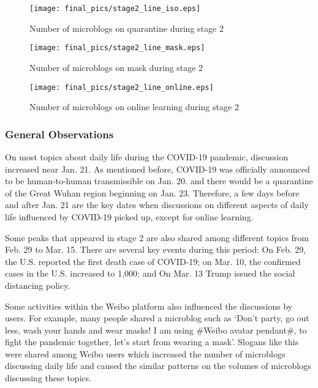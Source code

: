 \documentclass[sigconf, nonacm=true]{acmart}
\begin{document}
\begin{figure*}[t]
\begin{minipage}[t]{0.3\linewidth}
\centering
  \texttt{[image: final\_pics/stage2\_line\_iso.eps]}
  \vspace{-0.1cm}
  \caption{Number of microblogs on quarantine during stage 2}
  \vspace{-0.2cm}
  \label{figure:stage2_line_iso}
\end{minipage}
\begin{minipage}[t]{0.3\linewidth}
\centering
   \texttt{[image: final\_pics/stage2\_line\_mask.eps]}
   \vspace{-0.1cm}
  \caption{Number of microblogs on mask during stage 2}
  \vspace{-0.2cm}
  \label{figure:stage2_line_mask}
\end{minipage}
\begin{minipage}[t]{0.3\linewidth}
\centering
 \texttt{[image: final\_pics/stage2\_line\_online.eps]}
 \vspace{-0.1cm}
  \caption{Number of microblogs on online learning during stage 2}
  \vspace{-0.2cm}
  \label{figure:stage2_line_online}
\end{minipage}%
\end{figure*} 

\vspace{-0.2cm}
\subsubsection{General Observations}
On most topics about daily life during the COVID-19 pandemic, discussion increased near Jan. 21. 
As mentioned before, COVID-19 was officially announced to be human-to-human transmissible on Jan. 20. and there would be a quarantine of the Great Wuhan region beginning on Jan. 23.
Therefore, a few days before and after Jan. 21 are the key dates when discussions on different aspects of daily life influenced by COVID-19 picked up, except for online learning.

Some peaks that appeared in stage 2 are also shared among different topics from Feb. 29 to Mar. 15.
There are several key events during this period: 
On Feb. 29, the U.S. reported the first death case of COVID-19; on Mar. 10, the confirmed cases in the U.S. increased to 1,000; and On Mar. 13 Trump issued the social distancing policy.

Some activities within the Weibo platform also influenced the discussions by users.
For example, many people shared a microblog such as `Don't party, go out less, wash your hands and wear masks! I am using \#Weibo avatar pendant\#, to fight the pandemic together, let's start from wearing a mask'.
Slogans like this were shared among Weibo users which increased the number of microblogs discussing daily life and caused the similar patterns on the volumes of microblogs discussing these topics.
\end{document}
